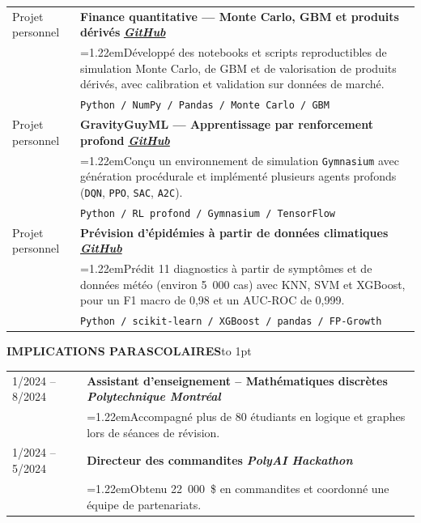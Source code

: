 \documentclass[a4paper,10pt]{article}
\newcommand{\sechead}[1]{\vspace{0.4em}\noindent\textbf{\large #1}\hspace{0.8em}\leaders\hbox to 1pt{\hss\raisebox{0.3em}{\rule{1pt}{0.4pt}}\hss}\hfill\null\par\vspace{0.45em}}
\newcommand{\bul}{\hangindent=1.22em\hangafter=1\hspace{0.5em}\textbullet\hspace{0.4em}}
\begin{document}
    \begin{tabularx}{\textwidth}{@{}p{3cm} X@{}}
        Projet personnel & \textbf{Finance quantitative — Monte Carlo, GBM et produits dérivés} \hfill \textbf{\textit{\href{https://github.com/Mbaka11/Quant-Finance-Learning-Notes}{GitHub}}} \\
        & \bul Développé des notebooks et scripts reproductibles de simulation Monte Carlo, de GBM et de valorisation de produits dérivés, avec calibration et validation sur données de marché. \\
        & \texttt{Python / NumPy / Pandas / Monte Carlo / GBM} \\[0.2em]

        Projet personnel & \textbf{GravityGuyML — Apprentissage par renforcement profond} \hfill \textbf{\textit{\href{https://github.com/Mbaka11/Gravity-Guy-ML}{GitHub}}} \\
        & \bul Conçu un environnement de simulation \texttt{Gymnasium} avec génération procédurale et implémenté plusieurs agents profonds (\texttt{DQN}, \texttt{PPO}, \texttt{SAC}, \texttt{A2C}). \\
        & \texttt{Python / RL profond / Gymnasium / TensorFlow} \\[0.2em]
        
        Projet personnel & 
        \textbf{Prévision d’épidémies à partir de données climatiques} \hfill \textbf{\textit{\href{https://github.com/Mbaka11/20251R0136COSE47101}{GitHub}}}\\[0.2em]
        & \bul Prédit 11 diagnostics à partir de symptômes et de données météo (environ 5~000 cas) avec KNN, SVM et XGBoost, pour un F1 macro de 0,98 et un AUC-ROC de 0,999. \\
        & \texttt{Python / scikit-learn / XGBoost / pandas / FP-Growth} \\
    \end{tabularx}

    \vspace{0em}
    \sechead{IMPLICATIONS PARASCOLAIRES}
    
    \begin{tabularx}{\textwidth}{@{}p{3cm} X@{}}
        1/2024 -- 8/2024 & 
        \textbf{Assistant d’enseignement – Mathématiques discrètes} \hfill \textbf{\textit{Polytechnique Montréal}} \\
        & \bul Accompagné plus de 80 étudiants en logique et graphes lors de séances de révision.\\[0.1em]
        
        1/2024 -- 5/2024 & 
        \textbf{Directeur des commandites} \hfill \textbf{\textit{PolyAI Hackathon}} \\
        & \bul Obtenu 22~000~\$ en commandites et coordonné une équipe de partenariats. 
    \end{tabularx}

\vspace{0cm}
\end{document}
